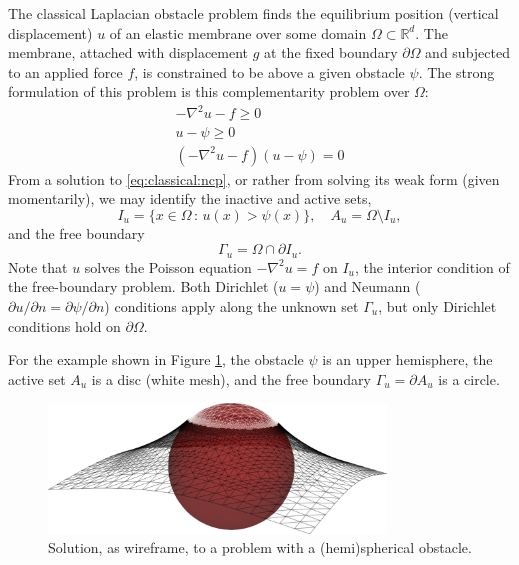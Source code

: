 \documentclass[]{interact}
\theoremstyle{plain}%
\theoremstyle{definition}
\theoremstyle{remark}
\newcommand{\RR}{\mathbb{R}}
\begin{document}
The classical Laplacian obstacle problem \cite{KinderlehrerStampacchia1980} finds the equilibrium position (vertical displacement) $u$ of an elastic membrane over some domain $\Omega \subset \RR^d$.  The membrane, attached with displacement $g$ at the fixed boundary $\partial\Omega$ and subjected to an applied force $f$, is constrained to be above a given obstacle $\psi$.  The strong formulation of this problem is this complementarity problem over $\Omega$:
\begin{subequations} \label{eq:classical:ncp}
\begin{align}
  -\nabla^2 u - f \geq 0 \label{eq:classical:ncp:a} \\
  u - \psi \geq 0\\
  (-\nabla^2u - f)(u - \psi) = 0 \label{eq:classical:ncp:c}
\end{align}
\end{subequations}
From a solution to \eqref{eq:classical:ncp}, or rather from solving its weak form (given momentarily), we may identify the inactive and active sets,
\begin{equation}
  I_u = \{x \in \Omega \,:\, u(x) > \psi(x)\}, \quad A_u = \Omega \setminus I_u, \label{eq:classical:sets}
\end{equation}
and the free boundary
\begin{equation}
\Gamma_u = \Omega \cap \partial I_u. \label{eq:classical:freeboundary}
\end{equation}
Note that $u$ solves the Poisson equation $-\nabla^2u = f$ on $I_u$, the interior condition of the free-boundary problem.  Both Dirichlet ($u=\psi$) and Neumann ($\partial u/\partial n = \partial \psi/\partial n$) conditions apply along the unknown set $\Gamma_u$, but only Dirichlet conditions hold on $\partial\Omega$.

For the example shown in Figure \ref{fig:ball}, the obstacle $\psi$ is an upper hemisphere, the active set $A_u$ is a disc (white mesh), and the free boundary $\Gamma_u=\partial A_u$ is a circle.

\begin{figure}[H]
\centering
\includegraphics[width=0.8\textwidth]{static/obstacle.png}
\caption{Solution, as wireframe, to a problem with a (hemi)spherical obstacle.}
\label{fig:ball}
\end{figure}
\end{document}
